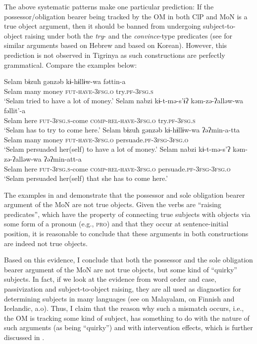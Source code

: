 \documentclass[output=paper]{langscibook}
\begin{document}
The above systematic patterns make one particular prediction:  If the possessor/obligation bearer being tracked by the OM in both ClP and MoN is a true object argument, then it should be banned from undergoing subject-to-object raising under both the \emph{try}- and the \emph{convince}-type predicates (see for similar arguments \citet{landau1999} based on Hebrew and \citet{kim11} based on Korean). However, this prediction is not observed in Tigrinya as such constructions are perfectly grammatical. Compare the examples below:


\ea\label{ex:Gebregziabher:RTO1}
\ea\label{ex:Gebregziabher:sor1} 
\gll Selam bɨzuħ gənzəb kɨ-hɨllɨw-wa fəttin-a\\
Selam many money {\scshape fut-have-3fsg.o} try.{\scshape pf-3fsg.s}\\
\glt `Selam tried to have a lot of money.'
\ex\label{ex:Gebregziabher:sor2}  
\gll Selam nabzi kɨ-t-mə-s'ɨʔ kəm-zə-ʔalləw-wa fəllit'-a\\
Selam here {\scshape fut-3fsg.s-}come {\scshape comp-rel-have-3fsg.o} try.{\scshape pf-3fsg.s}\\
\glt `Selam has to try to come here.'
\z
\ex\label{ex:Gebregziabher:RTO2}
\ea\label{ex:Gebregziabher:sor3}  
\gll Selam bɨzuħ gənzəb kɨ-hɨllɨw-wa ʔəʔmin-a-tta\\
Selam many money {\scshape fut-have-3fsg.o} persuade.{\scshape pf-3fsg-3fsg.o} \\
\glt `Selam persuaded her(self) to have a lot of money.'
\ex\label{ex:Gebregziabher:sor4}
\gll Selam nabzi kɨ-t-mə-s'ʔ kəm-zə-ʔalləw-wa ʔəʔmin-att-a\\
Selam here {\scshape fut-3fsg.s-}come {\scshape comp-rel-have-3fsg.o} persuade.{\scshape pf-3fsg-3fsg.o}\\
\glt `Selam persuaded her(self) that she has to come here.'
\z
\z

\noindent The examples in  and  demonstrate that the possessor and sole obligation bearer argument of the MoN are not true objects. Given the verbs are ``raising predicates'', which have the property of connecting true subjects with objects via some form of a pronoun (e.g., {\scshape pro}) and that they occur at sentence-initial position, it is reasonable to conclude that these arguments in both constructions are indeed not true objects.

Based on this evidence, I conclude that both the possessor and the sole obligation bearer argument of the MoN are not true objects, but some kind of ``quirky'' subjects. In fact, if we look at the evidence from word order and case, passivization and subject-to-object raising, they are all used as diagnostics for determining subjects in many languages (see \citealt{jaya2004} on Malayalam, \citealt{holmberg05} on Finnish and Icelandic, a.o). Thus, I claim that the reason why such a mismatch occurs, i.e., the OM is tracking some kind of subject, has something to do with the nature of such arguments (as being ``quirky'') and with intervention effects, which is further discussed in . 
\end{document}
